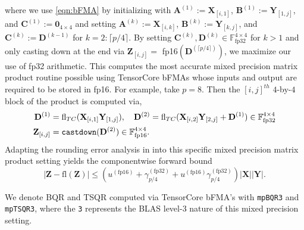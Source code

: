 \documentclass[review,onefignum,onetabnum]{siamart190516}
\newcommand{\F}{\mathbb{F}}
\newcommand{\bb}[1]{\mathbf{#1}}
\newcommand{\fl}{\mathrm{fl}}
\begin{document}
where we use \cref{eqn:bFMA} by initializing with $\bb{A}^{(1)}:= \bb{X}_{[i,1]}$, $\bb{B}^{(1)}:= \bb{Y}_{[1,j]}$, and $\bb{C}^{(1)}:= \bb{0}_{4\times 4}$ and setting $\bb{A}^{(k)}:= \bb{X}_{[i,k]}$, $\bb{B}^{(k)}:= \bb{Y}_{[k,j]}$, and $\bb{C}^{(k)}:= \bb{D}^{(k-1)}$ for $k=2:\lceil p/4\rceil$.
By setting $\bb{C}^{(k)}, \bb{D}^{(k)}\in\F_{\text{fp32}}^{4\times 4}$ for $k>1$ and only casting down at the end via $\bb{Z}_{[i,j]} =$ fp16$(\bb{D}^{(\lceil p/4\rceil)})$, we maximize our use of fp32 arithmetic.
This computes the most accurate mixed precision matrix product routine possible using TensorCore bFMAs whose inputs and output are required to be stored in fp16.
For example, take $p=8$.
Then the $[i,j]^{th}$ $4$-by-$4$ block of the product is computed via,
\begin{align*}
\bb{D}^{(1)} &= \fl_{TC}(\bb{X}_{[i,1]} \bb{Y}_{[1,j]}),\quad\bb{D}^{(2)} = \fl_{TC}(\bb{X}_{[i,2]} \bb{Y}_{[2,j]} + \bb{D}^{(1)})\in\F_{\text{fp32}}^{4\times 4}\\
\bb{Z}_{[i,j]} &= \text{\tt castdown}(\bb{D}^{(2)})\in\F_{\text{fp16}}^{4\times 4}.
\end{align*}
Adapting the rounding error analysis in \cite{Blanchard2020} into this specific mixed precision matrix product setting yields the componentwise forward bound 
\begin{equation}
|\bb{Z}-\fl(\bb{Z})| \leq \left(u^{(\text{fp16})}+ \gamma_{p/4}^{(\text{fp32})}+u^{(\text{fp16})} \gamma_{p/4}^{(\text{fp32})}\right)|\bb{X}||\bb{Y}|.\label{eqn:bFMAerr}
\end{equation}

We denote BQR and TSQR computed via TensorCore bFMA's with {\tt mpBQR3} and {\tt mpTSQR3}, where the {\tt 3} represents the BLAS level-3 nature of this mixed precision setting.
\end{document}
